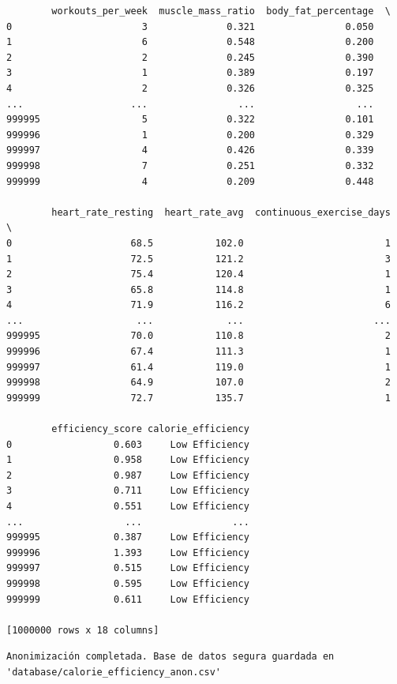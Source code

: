 \begin{lstlisting}
        workouts_per_week  muscle_mass_ratio  body_fat_percentage  \
0                       3              0.321                0.050   
1                       6              0.548                0.200   
2                       2              0.245                0.390   
3                       1              0.389                0.197   
4                       2              0.326                0.325   
...                   ...                ...                  ...   
999995                  5              0.322                0.101   
999996                  1              0.200                0.329   
999997                  4              0.426                0.339   
999998                  7              0.251                0.332   
999999                  4              0.209                0.448   

        heart_rate_resting  heart_rate_avg  continuous_exercise_days  \
0                     68.5           102.0                         1   
1                     72.5           121.2                         3   
2                     75.4           120.4                         1   
3                     65.8           114.8                         1   
4                     71.9           116.2                         6   
...                    ...             ...                       ...   
999995                70.0           110.8                         2   
999996                67.4           111.3                         1   
999997                61.4           119.0                         1   
999998                64.9           107.0                         2   
999999                72.7           135.7                         1   

        efficiency_score calorie_efficiency  
0                  0.603     Low Efficiency  
1                  0.958     Low Efficiency  
2                  0.987     Low Efficiency  
3                  0.711     Low Efficiency  
4                  0.551     Low Efficiency  
...                  ...                ...  
999995             0.387     Low Efficiency  
999996             1.393     Low Efficiency  
999997             0.515     Low Efficiency  
999998             0.595     Low Efficiency  
999999             0.611     Low Efficiency  

[1000000 rows x 18 columns]
\end{lstlisting}

\begin{lstlisting}
Anonimización completada. Base de datos segura guardada en 'database/calorie_efficiency_anon.csv'
\end{lstlisting}

